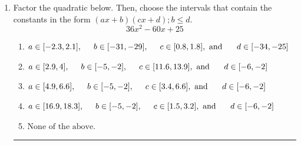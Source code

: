 \documentclass[14pt]{extbook}
\newcommand{\litem}[1]{\item#1\hspace*{-1cm}\rule{\textwidth}{0.4pt}}
\begin{document}
\begin{enumerate}
{\begin{enumerate}[label=\Alph*.]
\end{enumerate} }
\litem{
Factor the quadratic below. Then, choose the intervals that contain the constants in the form $(ax+b)(cx+d); b \leq d.$\[ 36x^{2} -60 x + 25 \]\begin{enumerate}[label=\Alph*.]
\item \( a \in [-2.3, 2.1], \hspace*{5mm} b \in [-31, -29], \hspace*{5mm} c \in [0.8, 1.8], \text{ and } \hspace*{5mm} d \in [-34, -25] \)
\item \( a \in [2.9, 4], \hspace*{5mm} b \in [-5, -2], \hspace*{5mm} c \in [11.6, 13.9], \text{ and } \hspace*{5mm} d \in [-6, -2] \)
\item \( a \in [4.9, 6.6], \hspace*{5mm} b \in [-5, -2], \hspace*{5mm} c \in [3.4, 6.6], \text{ and } \hspace*{5mm} d \in [-6, -2] \)
\item \( a \in [16.9, 18.3], \hspace*{5mm} b \in [-5, -2], \hspace*{5mm} c \in [1.5, 3.2], \text{ and } \hspace*{5mm} d \in [-6, -2] \)
\item \( \text{None of the above.} \)

\end{enumerate} }
\end{enumerate}
\end{document}
